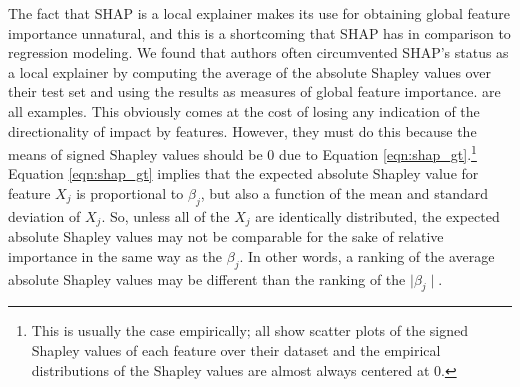 \documentclass[mnsc,blindrev]{informs3}
\begin{document}
     The fact that SHAP is a local explainer makes its use for obtaining global feature importance unnatural, and this is a shortcoming that SHAP has in comparison to regression modeling. We found that authors often circumvented SHAP's status as a local explainer by computing the average of the absolute Shapley values over their test set and using the results as measures of global feature importance. \cite{lenaers23rent,maeng23vr,guenther2023useful} are all examples. This obviously comes at the cost of losing any indication of the directionality of impact by features. However, they must do this because the means of signed Shapley values should be 0 due to Equation \ref{eqn:shap_gt}.\footnote{This is usually the case empirically; \cite{lenaers23rent,maeng23vr,jiang24churn} all show scatter plots of the signed Shapley values of each feature over their dataset and the empirical distributions of the Shapley values are almost always centered at 0.} Equation \ref{eqn:shap_gt} implies that the expected absolute Shapley value for feature $X_j$ is proportional to $\beta_j$, but also a function of the mean and standard deviation of $X_j$. So, unless all of the $X_j$ are identically distributed, the expected absolute Shapley values may not be comparable for the sake of relative importance in the same way as the $\beta_j$. In other words, a ranking of the average absolute Shapley values may be different than the ranking of the $\mid \beta_j\mid$. 
     
     
\end{document}
